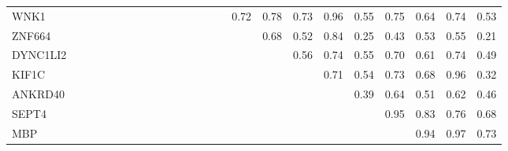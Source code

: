 \begin{longtable}{lrrrrrrrrrrrrrrrrrrrrrrr}
WNK1     &              &              &            &            &            &             &               &             &             &              &             &                &            &            &         0.72 &           0.78 &        0.73 &          0.96 &        0.55 &      0.75 &           0.64 &        0.74 &          0.53 \\
ZNF664   &              &              &            &            &            &             &               &             &             &              &             &                &            &            &              &           0.68 &        0.52 &          0.84 &        0.25 &      0.43 &           0.53 &        0.55 &          0.21 \\
DYNC1LI2 &              &              &            &            &            &             &               &             &             &              &             &                &            &            &              &                &        0.56 &          0.74 &        0.55 &      0.70 &           0.61 &        0.74 &          0.49 \\
KIF1C    &              &              &            &            &            &             &               &             &             &              &             &                &            &            &              &                &             &          0.71 &        0.54 &      0.73 &           0.68 &        0.96 &          0.32 \\
ANKRD40  &              &              &            &            &            &             &               &             &             &              &             &                &            &            &              &                &             &               &        0.39 &      0.64 &           0.51 &        0.62 &          0.46 \\
SEPT4    &              &              &            &            &            &             &               &             &             &              &             &                &            &            &              &                &             &               &             &      0.95 &           0.83 &        0.76 &          0.68 \\
MBP      &              &              &            &            &            &             &               &             &             &              &             &                &            &            &              &                &             &               &             &           &           0.94 &        0.97 &          0.73 \\

\end{longtable}

